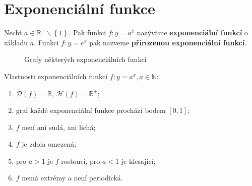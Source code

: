 \section{Exponenciální funkce}
\begin{definition}
    Nechť $a\in \mathbb R^+ \smallsetminus \left \{ 1 \right \}. $ Pak funkci $f\colon y=a^x$
    nazýváme \textbf{exponenciální funkcí} o základu $a$. Funkci $f\colon y=e^x$ pak
    nazveme \textbf{přirozenou exponenciální funkcí}.
\end{definition}

\begin{figure}[ht!]
  \centering
  \caption{Grafy některých exponenciálních funkcí}
\end{figure}

\begin{veta}
    Vlastnosti exponenciálních funkcí $f\colon y= a^x, a \in \mathbb N$:
    \begin{enumerate}[$i.$]
        \item $\mathcal D(f)= \mathbb R$, $\mathcal H(f)= \mathbb R^+$;
       	\item graf každé exponenciální funkce prochází bodem $[0,1]$;
        \item $f$ není ani sudá, ani lichá;
        \item $f$ je zdola omezená;
        \item pro $a >1$ je $f$ rostoucí, pro $a<1$ je klesající;
        \item $f$ nemá extrémy a není periodická.
    \end{enumerate}
\end{veta}

